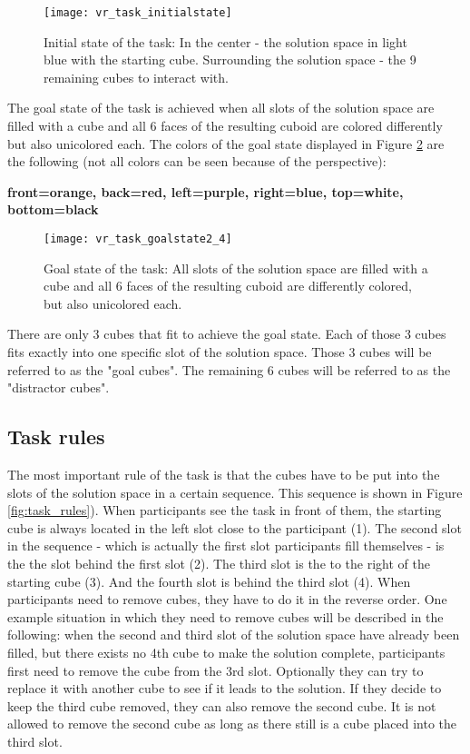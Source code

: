 \begin{figure}[h]
\centering
\texttt{[image: vr\_task\_initialstate]}
\caption{Initial state of the task: In the center - the solution space in light blue with the starting cube. Surrounding the solution space - the 9 remaining cubes to interact with. }
\label{fig:vr_task_initialstate}
\end{figure}

\newpage

The goal state of the task is achieved when all slots of the solution space are filled with a cube and all 6 faces of the resulting cuboid are colored differently but also unicolored each. The colors of the goal state displayed in Figure \ref{fig:vr_task_goalstate} are the following (not all colors can be seen because of the perspective):

\begin{center}
\textbf{front=orange, back=red, left=purple, right=blue, top=white, bottom=black}
\end{center}

\begin{figure}[h]
\centering
\texttt{[image: vr\_task\_goalstate2\_4]}
\caption{Goal state of the task: All slots of the solution space are filled with a cube and all 6 faces of the resulting cuboid are differently colored, but also unicolored each. }
\label{fig:vr_task_goalstate}
\end{figure}

There are only 3 cubes that fit to achieve the goal state. Each of those 3 cubes fits exactly into one specific slot of the solution space. Those 3 cubes will be referred to as the "goal cubes". The remaining 6 cubes will be referred to as the "distractor cubes".

\subsection{Task rules} \label{sec:task_rules}
The most important rule of the task is that the cubes have to be put into the slots of the solution space in a certain sequence.
This sequence is shown in Figure \ref{fig:task_rules}). When participants see the task in front of them, the starting cube is always located in the left slot close to the participant (1). The second slot in the sequence - which is actually the first slot participants fill themselves - is the the slot behind the first slot (2). The third slot is the to the right of the starting cube (3). And the fourth slot is behind the third slot (4). When participants need to remove cubes, they have to do it in the reverse order. One example situation in which they need to remove cubes will be described in the following: when the second and third slot of the solution space have already been filled, but there exists no 4th cube to make the solution complete, participants first need to remove the cube from the 3rd slot. Optionally they can try to replace it with another cube to see if it leads to the solution. If they decide to keep the third cube removed, they can also remove the second cube. It is not allowed to remove the second cube as long as there still is a cube placed into the third slot. 

